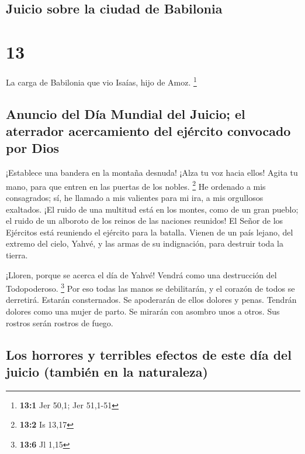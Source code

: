 \hypertarget{juicio-sobre-la-ciudad-de-babilonia}{%
\subsection{Juicio sobre la ciudad de
Babilonia}\label{juicio-sobre-la-ciudad-de-babilonia}}

\hypertarget{section-12}{%
\section{13}\label{section-12}}

 La carga de Babilonia que vio Isaías, hijo de Amoz.
\footnote{\textbf{13:1} Jer 50,1; Jer 51,1-51}

\hypertarget{anuncio-del-duxeda-mundial-del-juicio-el-aterrador-acercamiento-del-ejuxe9rcito-convocado-por-dios}{%
\subsection{Anuncio del Día Mundial del Juicio; el aterrador
acercamiento del ejército convocado por
Dios}\label{anuncio-del-duxeda-mundial-del-juicio-el-aterrador-acercamiento-del-ejuxe9rcito-convocado-por-dios}}

 ¡Establece una bandera en la montaña desnuda! ¡Alza tu
voz hacia ellos! Agita tu mano, para que entren en las puertas de los
nobles. \footnote{\textbf{13:2} Is 13,17}  He ordenado a
mis consagrados; sí, he llamado a mis valientes para mi ira, a mis
orgullosos exaltados.  ¡El ruido de una multitud está en
los montes, como de un gran pueblo; el ruido de un alboroto de los
reinos de las naciones reunidos! El Señor de los Ejércitos está
reuniendo el ejército para la batalla.  Vienen de un país
lejano, del extremo del cielo, Yahvé, y las armas de su indignación,
para destruir toda la tierra.

 ¡Lloren, porque se acerca el día de Yahvé! Vendrá como
una destrucción del Todopoderoso. \footnote{\textbf{13:6} Jl 1,15}
 Por eso todas las manos se debilitarán, y el corazón de
todos se derretirá.  Estarán consternados. Se apoderarán
de ellos dolores y penas. Tendrán dolores como una mujer de parto. Se
mirarán con asombro unos a otros. Sus rostros serán rostros de fuego.

\hypertarget{los-horrores-y-terribles-efectos-de-este-duxeda-del-juicio-tambiuxe9n-en-la-naturaleza}{%
\subsection{Los horrores y terribles efectos de este día del juicio
(también en la
naturaleza)}\label{los-horrores-y-terribles-efectos-de-este-duxeda-del-juicio-tambiuxe9n-en-la-naturaleza}}

